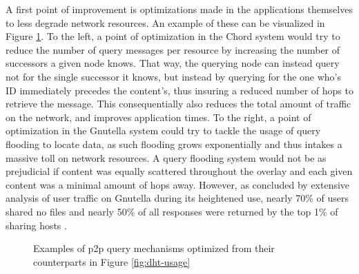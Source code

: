     A first point of improvement is optimizations made in the applications themselves to less degrade network resources.
    An example of these can be visualized in Figure \ref{fig:p2p-optimization}.
    To the left, a point of optimization in the Chord system would try to reduce the number of query messages per resource by increasing the number of successors a given node knows.
    That way, the querying node can instead query not for the single successor it knows, but instead by querying for the one who's ID immediately precedes the content's, thus insuring a reduced number of hops to retrieve the message.
    This consequentially also reduces the total amount of traffic on the network, and improves application times.
    To the right, a point of optimization in the Gnutella system could try to tackle the usage of query flooding to locate data, as such flooding grows exponentially and thus intakes a massive toll on network resources.
    A query flooding system would not be as prejudicial if content was equally scattered throughout the overlay and each given content was a minimal amount of hops away.
    However, as concluded by extensive analysis of user traffic on Gnutella during its heightened use, nearly 70\% of users shared no files and nearly 50\% of all responses were returned by the top 1\% of sharing hosts \cite{freeriding-gnutella}.

\begin{figure}%
\centering
{}%
\qquad
{}%
\caption{Examples of \gls{p2p} query mechanisms optimized from their counterparts in Figure \ref{fig:dht-usage}}
\label{fig:p2p-optimization}
\end{figure}

